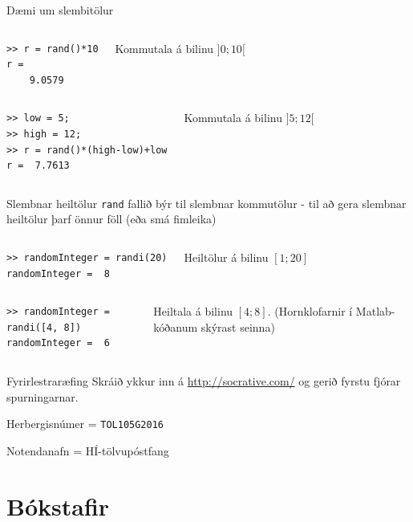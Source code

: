 \documentclass{beamer}
\begin{document}
\begin{frame}[fragile]{Dæmi um slembitölur}
\vspace{-0.5cm}
\begin{columns}
\begin{verbatim}
>> r = rand()*10
r =
    9.0579
\end{verbatim}
Kommutala á bilinu $]0;10[$
\end{columns}

\begin{columns}
\begin{verbatim}
>> low = 5;
>> high = 12;
>> r = rand()*(high-low)+low
r =  7.7613
\end{verbatim}
Kommutala á bilinu $]5;12[$
\end{columns}
\end{frame}

\begin{frame}[fragile]{Slembnar heiltölur}
\texttt{rand} fallið býr til slembnar kommutölur - til að gera slembnar heiltölur þarf önnur föll (eða smá fimleika)
\begin{columns}
\begin{verbatim}
>> randomInteger = randi(20)
randomInteger =  8
\end{verbatim}
Heiltölur á bilinu $[1;20]$
\end{columns}

\begin{columns}
\begin{verbatim}
>> randomInteger = randi([4, 8])
randomInteger =  6
\end{verbatim}
Heiltala á bilinu $[4; 8]$. (Hornklofarnir í Matlab-kóðanum skýrast seinna)
\end{columns}
\end{frame}

\begin{frame}{Fyrirlestraræfing}
Skráið ykkur inn á \url{http://socrative.com/} og gerið fyrstu fjórar spurningarnar.

Herbergisnúmer = \texttt{TOL105G2016}

Notendanafn = HÍ-tölvupóstfang
\end{frame}

\section{Bókstafir}
\end{document}
